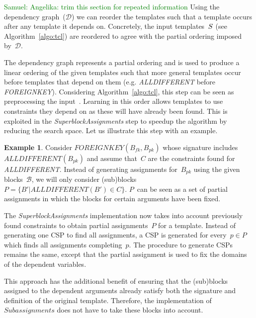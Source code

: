 \documentclass{IEEEtran}
\newcommand{\samuel}[1]{\textcolor{green}{{\sc Samuel:} #1}\xspace}
\newcommand{\format}[1]{\textit{#1}\xspace}
\newcommand{\generategroups}{\format{SuperblockAssignments}}
\newcommand{\findassignment}{\format{Subassignments}}
\newcommand{\dependencies}{\ensuremath{\mathcal{D}}\xspace}
\newcommand{\blocks}{\ensuremath{\mathcal{B}}\xspace}
\newcommand{\ecfkey}[2]{\ensuremath{\textit{FOREIGNKEY}(#1,#2)}}
\newcommand{\ecalldiff}[1]{\ensuremath{\textit{ALLDIFFERENT}(#1)}}
\theoremstyle{definition}
\newtheorem{example}{Example}
\begin{document}
\samuel{Angelika: trim this section for repeated information}
Using the dependency graph~(\dependencies) we can reorder the templates such that a template occurs after any template it depends on.
Concretely, the input templates~$S$ (see Algorithm~\ref{algo:tcl}) are reordered to agree with the partial ordering imposed by~\dependencies.

The dependency graph represents a partial ordering and is used to produce a linear ordering of the given templates such that more general templates occur before templates that depend on them (e.g. \textit{ALLDIFFERENT} before \textit{FOREIGNKEY}).
Considering Algorithm~\ref{algo:tcl}, this step can be seen as preprocessing the input~\temps.
Learning in this order allows templates to use constraints they depend on as these will have already been found.
This is exploited in the \generategroups step to speedup the algorithm by reducing the search space.
Let us illustrate this step with an example.

\begin{example}
  Consider $\ecfkey{B_{fk}}{B_{pk}}$ whose signature includes $\ecalldiff{B_{pk}}$ and assume that~$C$ are the constraints found for \textit{ALLDIFFERENT}.
  Instead of generating assignments for~$B_{pk}$ using the given blocks~$\blocks$, we will only consider (sub)blocks~$P = \{ B' | \ecalldiff{B'} \in C \}$.
  $P$~can be seen as a set of partial assignments in which the blocks for certain arguments have been fixed.
\end{example}

The \generategroups implementation now takes into account previously found constraints to obtain partial assignments~$P$ for a template.
Instead of generating one CSP to find all assignments, a CSP is generated for every~$p \in P$ which finds all assignments completing~$p$.
The procedure to generate CSPs remains the same, except that the partial assignment is used to fix the domains of the dependent variables.

This approach has the additional benefit of ensuring that the (sub)blocks assigned to the dependent arguments already satisfy both the signature and definition of the original template.
Therefore, the implementation of $\findassignment$ does not have to take these blocks into account.
\end{document}
